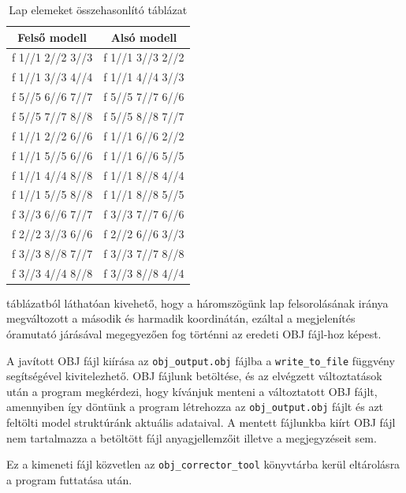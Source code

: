 \begin{table}[h]
\centering
\caption{Lap elemeket összehasonlító táblázat}
\bigskip
\begin{tabular}{|c|c|}
Felső modell& Alsó modell \\
\hline
f  1//1 2//2 3//3 & f  1//1 3//3 2//2 \\
f  1//1 3//3 4//4 & f  1//1 4//4 3//3 \\
f  5//5 6//6 7//7 & f  5//5 7//7 6//6 \\
f  5//5 7//7 8//8 & f  5//5 8//8 7//7 \\ 
f  1//1 2//2 6//6 & f  1//1 6//6 2//2 \\
f  1//1 5//5 6//6 & f  1//1 6//6 5//5 \\
f  1//1 4//4 8//8 & f  1//1 8//8 4//4 \\
f  1//1 5//5 8//8 & f  1//1 8//8 5//5 \\
f  3//3 6//6 7//7 & f  3//3 7//7 6//6 \\
f  2//2 3//3 6//6 & f  2//2 6//6 3//3 \\
f  3//3 8//8 7//7 & f  3//3 7//7 8//8 \\
f  3//3 4//4 8//8 & f  3//3 8//8 4//4 \\
\hline
\end{tabular}
\label{fig:bej3}
\end{table}
\bigskip 

 táblázatból láthatóan kivehető, hogy a háromszögünk lap felsorolásának iránya megváltozott a második és harmadik koordinátán, ezáltal a megjelenítés óramutató járásával megegyezően fog történni az eredeti OBJ fájl-hoz képest.


A javított OBJ fájl kiírása az \texttt{obj\_output.obj} fájlba a \texttt{write\_to\_file} függvény segítségével kivitelezhető. OBJ fájlunk betöltése, és az elvégzett változtatások után a program megkérdezi, hogy kívánjuk menteni a változtatott OBJ fájlt, amennyiben így döntünk a program létrehozza az \texttt{obj\_output.obj} fájlt és azt feltölti model struktúránk aktuális adataival. A mentett fájlunkba kiírt OBJ fájl nem tartalmazza a betöltött fájl anyagjellemzőit illetve a megjegyzéseit sem.
\bigskip
{}
\bigskip

Ez a kimeneti fájl közvetlen az \texttt{obj\_corrector\_tool} könyvtárba kerül eltárolásra a program futtatása után.
